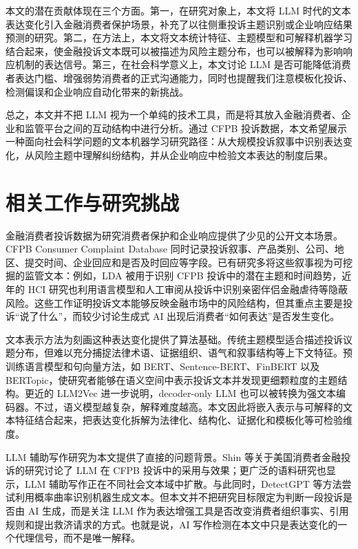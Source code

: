 \documentclass[UTF8]{ctexart}
\begin{document}
本文的潜在贡献体现在三个方面。第一，在研究对象上，本文将 LLM 时代的文本表达变化引入金融消费者保护场景，补充了以往侧重投诉主题识别或企业响应结果预测的研究。第二，在方法上，本文将文本统计特征、主题模型和可解释机器学习结合起来，使金融投诉文本既可以被描述为风险主题分布，也可以被解释为影响响应机制的表达信号。第三，在社会科学意义上，本文讨论 LLM 是否可能降低消费者表达门槛、增强弱势消费者的正式沟通能力，同时也提醒我们注意模板化投诉、检测偏误和企业响应自动化带来的新挑战。

总之，本文并不把 LLM 视为一个单纯的技术工具，而是将其放入金融消费者、企业和监管平台之间的互动结构中进行分析。通过 CFPB 投诉数据，本文希望展示一种面向社会科学问题的文本机器学习研究路径：从大规模投诉叙事中识别表达变化，从风险主题中理解纠纷结构，并从企业响应中检验文本表达的制度后果。

\section{相关工作与研究挑战}

金融消费者投诉数据为研究消费者保护和企业响应提供了少见的公开文本场景。CFPB Consumer Complaint Database 同时记录投诉叙事、产品类别、公司、地区、提交时间、企业回应和是否及时回应等字段\cite{cfpb_database,cfpb_fields}。已有研究多将这些叙事视为可挖掘的监管文本：例如，LDA 被用于识别 CFPB 投诉中的潜在主题和时间趋势\cite{blei2003lda,bastani2019lda}，近年的 HCI 研究也利用语言模型和人工审阅从投诉中识别亲密伴侣金融虐待等隐蔽风险\cite{bhattacharya2024shortchanged}。这些工作证明投诉文本能够反映金融市场中的风险结构，但其重点主要是投诉“说了什么”，而较少讨论生成式 AI 出现后消费者“如何表达”是否发生变化。

文本表示方法为刻画这种表达变化提供了算法基础。传统主题模型适合描述投诉议题分布，但难以充分捕捉法律术语、证据组织、语气和叙事结构等上下文特征。预训练语言模型和句向量方法，如 BERT、Sentence-BERT、FinBERT 以及 BERTopic，使研究者能够在语义空间中表示投诉文本并发现更细颗粒度的主题结构\cite{devlin2019bert,reimers2019sentencebert,yang2020finbert,grootendorst2022bertopic}。更近的 LLM2Vec 进一步说明，decoder-only LLM 也可以被转换为强文本编码器\cite{behnamghader2024llm2vec}。不过，语义模型越复杂，解释难度越高。本文因此将嵌入表示与可解释的文本特征结合起来，把表达变化拆解为法律化、结构化、证据化和模板化等可检验维度。

LLM 辅助写作研究为本文提供了直接的问题背景。Shin 等关于美国消费者金融投诉的研究讨论了 LLM 在 CFPB 投诉中的采用与效果\cite{shin2026llmcomplaints}；更广泛的语料研究也显示，LLM 辅助写作正在不同社会文本域中扩散\cite{liang2025widespread}。与此同时，DetectGPT 等方法尝试利用概率曲率识别机器生成文本\cite{mitchell2023detectgpt}。但本文并不把研究目标限定为判断一段投诉是否由 AI 生成，而是关注 LLM 作为表达增强工具是否改变消费者组织事实、引用规则和提出救济请求的方式。也就是说，AI 写作检测在本文中只是表达变化的一个代理信号，而不是唯一解释。
\end{document}
